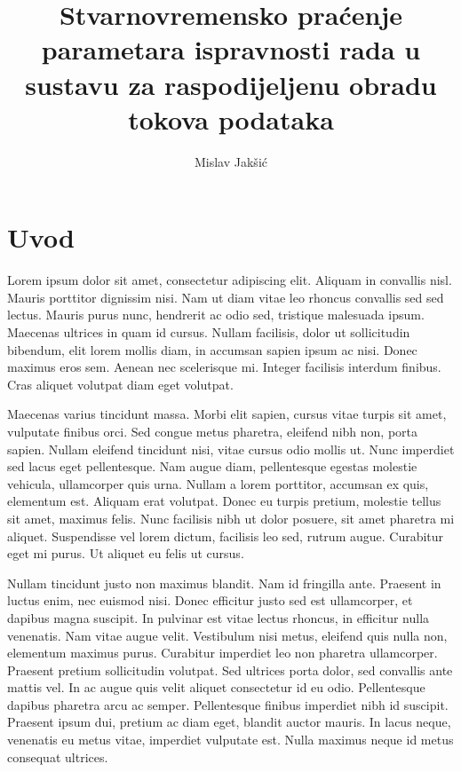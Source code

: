 \documentclass[times, utf8, diplomski]{fer}
\begin{document}

\title{Stvarnovremensko praćenje parametara ispravnosti rada u sustavu za raspodijeljenu obradu tokova podataka}

\author{Mislav Jakšić}

\maketitle

\izvornik


\tableofcontents

\chapter{Uvod}
Lorem ipsum dolor sit amet, consectetur adipiscing elit. Aliquam in convallis nisl. Mauris porttitor dignissim nisi. Nam ut diam vitae leo rhoncus convallis sed sed lectus. Mauris purus nunc, hendrerit ac odio sed, tristique malesuada ipsum. Maecenas ultrices in quam id cursus. Nullam facilisis, dolor ut sollicitudin bibendum, elit lorem mollis diam, in accumsan sapien ipsum ac nisi. Donec maximus eros sem. Aenean nec scelerisque mi. Integer facilisis interdum finibus. Cras aliquet volutpat diam eget volutpat.

Maecenas varius tincidunt massa. Morbi elit sapien, cursus vitae turpis sit amet, vulputate finibus orci. Sed congue metus pharetra, eleifend nibh non, porta sapien. Nullam eleifend tincidunt nisi, vitae cursus odio mollis ut. Nunc imperdiet sed lacus eget pellentesque. Nam augue diam, pellentesque egestas molestie vehicula, ullamcorper quis urna. Nullam a lorem porttitor, accumsan ex quis, elementum est. Aliquam erat volutpat. Donec eu turpis pretium, molestie tellus sit amet, maximus felis. Nunc facilisis nibh ut dolor posuere, sit amet pharetra mi aliquet. Suspendisse vel lorem dictum, facilisis leo sed, rutrum augue. Curabitur eget mi purus. Ut aliquet eu felis ut cursus.

Nullam tincidunt justo non maximus blandit. Nam id fringilla ante. Praesent in luctus enim, nec euismod nisi. Donec efficitur justo sed est ullamcorper, et dapibus magna suscipit. In pulvinar est vitae lectus rhoncus, in efficitur nulla venenatis. Nam vitae augue velit. Vestibulum nisi metus, eleifend quis nulla non, elementum maximus purus. Curabitur imperdiet leo non pharetra ullamcorper. Praesent pretium sollicitudin volutpat. Sed ultrices porta dolor, sed convallis ante mattis vel. In ac augue quis velit aliquet consectetur id eu odio. Pellentesque dapibus pharetra arcu ac semper. Pellentesque finibus imperdiet nibh id suscipit. Praesent ipsum dui, pretium ac diam eget, blandit auctor mauris. In lacus neque, venenatis eu metus vitae, imperdiet vulputate est. Nulla maximus neque id metus consequat ultrices.
\end{document}
